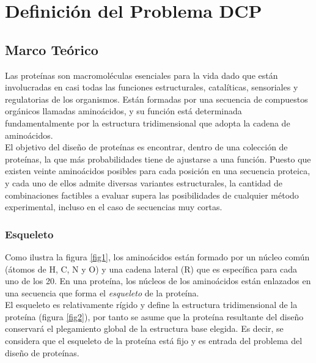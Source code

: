 \documentclass[letterpaper, 12pt]{report}
\begin{document}
\chapter{Definici\'on del Problema DCP}

\section{Marco Te\'orico}

Las proteínas son macromol\'eculas esenciales para la vida dado que est\'an involucradas en casi todas las funciones estructurales,
catal\'iticas, sensoriales y regulatorias de los organismos. Est\'an formadas por una secuencia de compuestos org\'anicos llamadas aminoácidos,
y su función está determinada fundamentalmente por la estructura tridimensional que adopta la cadena de aminoácidos. \\  

El objetivo del diseño de proteínas es encontrar, dentro de una colección de proteínas, la que m\'as probabilidades tiene de ajustarse a una función.
Puesto que existen veinte aminoácidos posibles para cada posición en una secuencia proteica, y cada uno de ellos admite diversas variantes estructurales, 
la cantidad de combinaciones factibles a evaluar supera las posibilidades de cualquier método experimental, incluso en el caso de secuencias muy cortas.


\subsection{Esqueleto}

Como ilustra la figura \ref{fig1}, los aminoácidos est\'an formado por un n\'ucleo com\'un (\'atomos de H, C, N y O) y una
cadena lateral (R) que es espec\'ifica para cada uno de los 20. En una proteína, los núcleos de los amino\'acidos están
enlazados en una secuencia que forma el \textit{esqueleto} de la proteína. \\



El esqueleto es relativamente r\'igido y define la estructura tridimensional de la proteína (figura \ref{fig2}), por tanto se asume
que la proteína resultante del diseño conservar\'a el plegamiento global de la estructura base elegida. Es decir,
se considera que el esqueleto de la proteína está fijo y es entrada del problema del diseño de proteínas. \\

\newpage
\end{document}
